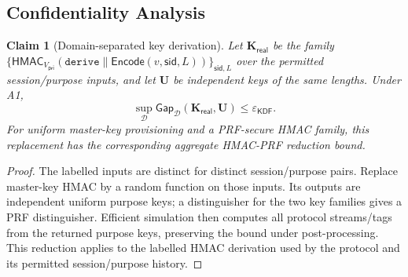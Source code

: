 \documentclass[pdflatex,sn-mathphys-num]{sn-jnl}%
\newtheorem{claim}{Claim}
\theoremstyle{definition}
\theoremstyle{game}
\theoremstyle{thmstyleone}%
\theoremstyle{thmstyletwo}%
\theoremstyle{thmstylethree}%
\begin{document}
\subsection{Confidentiality Analysis}\label{Confidentiality Analysis}
\begin{claim}[Domain-separated key derivation]\label{Claim1}
Let $\mathbf K_{\mathsf{real}}$ be the family
$\{\mathsf{HMAC}_{V_{\mathsf{pri}}}(\texttt{derive}\parallel
\mathsf{Encode}(v,\mathsf{sid},L))\}_{\mathsf{sid},L}$ over the permitted
session/purpose inputs, and let $\mathbf U$ be independent keys of the
same lengths. Under A1,
\[
\sup_{\mathcal D}\mathsf{Gap}_{\mathcal D}
(\mathbf K_{\mathsf{real}},\mathbf U)\le\varepsilon_{\mathsf{KDF}}.
\]
For uniform master-key provisioning and a PRF-secure HMAC family, this
replacement has the corresponding aggregate HMAC-PRF reduction bound.
\end{claim}
\begin{proof}
The labelled inputs are distinct for distinct session/purpose pairs.
Replace master-key HMAC by a random function on those inputs. Its outputs
are independent uniform purpose keys; a distinguisher for the two key
families gives a PRF distinguisher. Efficient simulation then computes all
protocol streams/tags from the returned purpose keys, preserving the bound
under post-processing. This reduction applies to the labelled HMAC derivation used by the
protocol and its permitted session/purpose history.
\end{proof}
\end{document}
